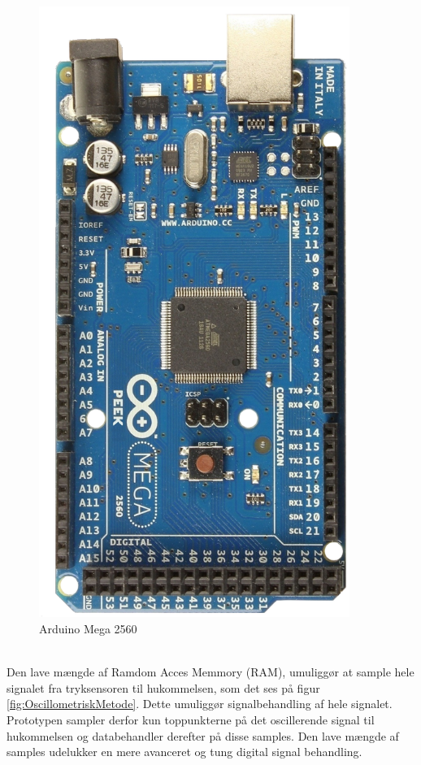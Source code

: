 \begin{minipage}[t]{0.4\textwidth}
	\begin{figure}[H]
		\centering
		\includegraphics[width = 0.9\textwidth]{billeder/arduinoMega2560.png}
		\caption{Arduino Mega 2560}\label{fig:arduinoMega2560}
	\end{figure}
\end{minipage}\\

Den lave mængde af Ramdom Acces Memmory (RAM), umuliggør at sample hele signalet fra tryksensoren til hukommelsen, som det ses på figur \ref{fig:OscillometriskMetode}. Dette umuliggør signalbehandling af hele signalet. Prototypen sampler derfor kun toppunkterne på det oscillerende signal til hukommelsen og databehandler derefter på disse samples. Den lave mængde af samples udelukker en mere avanceret og tung digital signal behandling.


